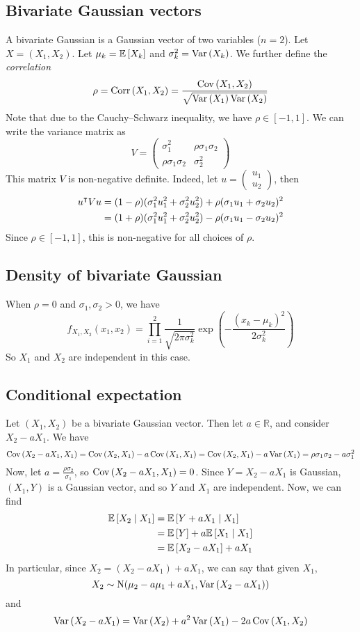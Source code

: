 \subsection{Bivariate Gaussian vectors}
A bivariate Gaussian is a Gaussian vector of two variables (\(n=2\)).
Let \(X = (X_1, X_2)\).
Let \(\mu_k = \mathbb{E}\left[{X_k}\right]\) and \(\sigma_k^2 = \operatorname{Var}\left({X_k}\right)\).
We further define the \textit{correlation}
\[
	\rho = \operatorname{Corr}\left({X_1, X_2}\right) = \frac{\operatorname{Cov}\left({X_1, X_2}\right)}{\sqrt{\operatorname{Var}\left({X_1}\right)\operatorname{Var}\left({X_2}\right)}}
\]
Note that due to the Cauchy--Schwarz inequality, we have \(\rho \in [-1, 1]\).
We can write the variance matrix as
\[
	V = \begin{pmatrix}
		\sigma_1^2             & \rho \sigma_1 \sigma_2 \\
		\rho \sigma_1 \sigma_2 & \sigma_2^2
	\end{pmatrix}
\]
This matrix \(V\) is non-negative definite.
Indeed, let \(u = \begin{pmatrix} u_1 \\ u_2 \end{pmatrix}\), then
\begin{align*}
	u^\intercal V u & = (1-\rho)(\sigma_1^2 u_1^2 + \sigma_2^2 u_2^2) + \rho(\sigma_1 u_1 + \sigma_2 u_2)^2 \\
	                 & = (1+\rho)(\sigma_1^2 u_1^2 + \sigma_2^2 u_2^2) - \rho(\sigma_1 u_1 - \sigma_2 u_2)^2
\end{align*}
Since \(\rho \in [-1, 1]\), this is non-negative for all choices of \(\rho\).

\subsection{Density of bivariate Gaussian}
When \(\rho = 0\) and \(\sigma_1, \sigma_2 > 0\), we have
\[
	f_{X_1, X_2}(x_1, x_2) = \prod_{i=1}^2 \frac{1}{\sqrt{2\pi \sigma_k^2}} \exp(-\frac{(x_k - \mu_k)^2}{2\sigma_k^2})
\]
So \(X_1\) and \(X_2\) are independent in this case.

\subsection{Conditional expectation}
Let \((X_1, X_2)\) be a bivariate Gaussian vector.
Then let \(a \in \mathbb R\), and consider \(X_2 - aX_1\).
We have
\[
	\operatorname{Cov}\left({X_2 - aX_1, X_1}\right) = \operatorname{Cov}\left({X_2, X_1}\right) - a\operatorname{Cov}\left({X_1, X_1}\right) = \operatorname{Cov}\left({X_2, X_1}\right) - a \operatorname{Var}\left({X_1}\right) = \rho \sigma_1 \sigma_2 - a\sigma_1^2
\]
Now, let \(a = \frac{\rho \sigma_2}{\sigma_1}\), so \(\operatorname{Cov}\left({X_2 - aX_1, X_1}\right) = 0\).
Since \(Y = X_2 - aX_1\) is Gaussian, \((X_1, Y)\) is a Gaussian vector, and so \(Y\) and \(X_1\) are independent.
Now, we can find
\begin{align*}
	\mathbb{E}\left[{X_2 \mid X_1}\right] & = \mathbb{E}\left[{Y + aX_1 \mid X_1}\right]          \\
	                      & = \mathbb{E}\left[{Y}\right] + a\mathbb{E}\left[{X_1 \mid X_1}\right] \\
	                      & = \mathbb{E}\left[{X_2 - aX_1}\right] + aX_1
\end{align*}
In particular, since \(X_2 = (X_2 - aX_1) + aX_1\), we can say that given \(X_1\),
\[
	X_2 \sim \mathrm{N}(\mu_2 - a\mu_1 + aX_1, \operatorname{Var}\left({X_2 - aX_1}\right))
\]
and
\[
	\operatorname{Var}\left({X_2 - aX_1}\right) = \operatorname{Var}\left({X_2}\right) + a^2 \operatorname{Var}\left({X_1}\right) - 2a \operatorname{Cov}\left({X_1, X_2}\right)
\]

